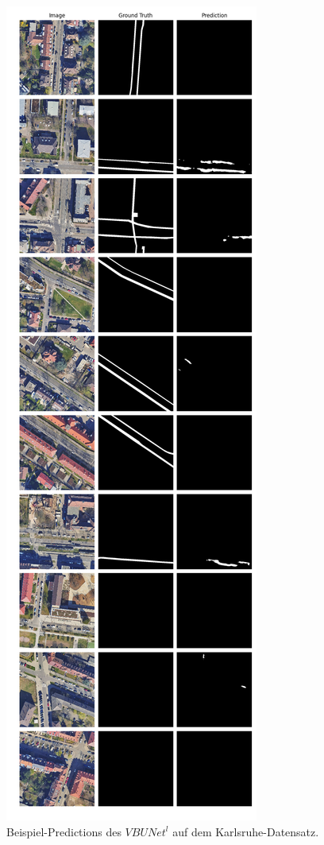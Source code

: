 \begin{figure}
	\centering
	\includegraphics[width=.41\textwidth]{Bilder/Samples-KA/vbunet-l.png} 
	\caption{Beispiel-Predictions des $VBUNet^l$ auf dem Karlsruhe-Datensatz.}
	\label{fig:ka-samples-vbunet-l}
\end{figure}

